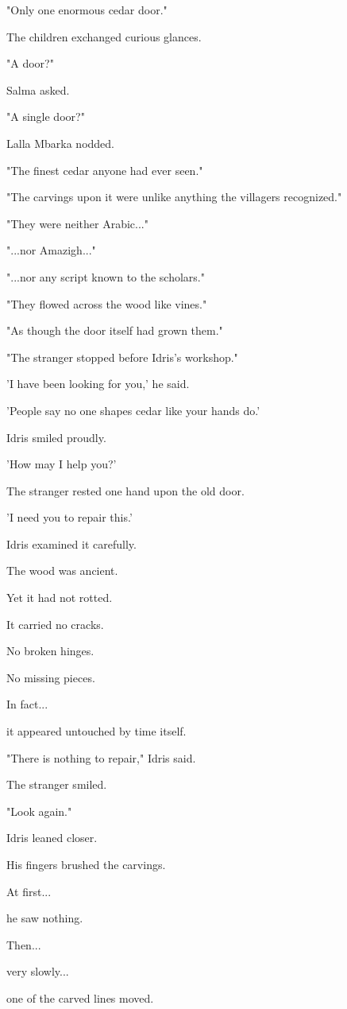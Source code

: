 \documentclass[12pt,openany]{book}
\begin{document}
"Only one enormous cedar door."

The children exchanged curious glances.

"A door?"

Salma asked.

"A single door?"

Lalla Mbarka nodded.

"The finest cedar anyone had ever seen."

"The carvings upon it were unlike anything the villagers recognized."

"They were neither Arabic..."

"...nor Amazigh..."

"...nor any script known to the scholars."

"They flowed across the wood like vines."

"As though the door itself had grown them."

"The stranger stopped before Idris's workshop."

'I have been looking for you,' he said.

'People say no one shapes cedar like your hands do.'

Idris smiled proudly.

'How may I help you?'

The stranger rested one hand upon the old door.

'I need you to repair this.'

Idris examined it carefully.

The wood was ancient.

Yet it had not rotted.

It carried no cracks.

No broken hinges.

No missing pieces.

In fact...

it appeared untouched by time itself.

"There is nothing to repair," Idris said.

The stranger smiled.

"Look again."

Idris leaned closer.

His fingers brushed the carvings.

At first...

he saw nothing.

Then...

very slowly...

one of the carved lines moved.
\end{document}
